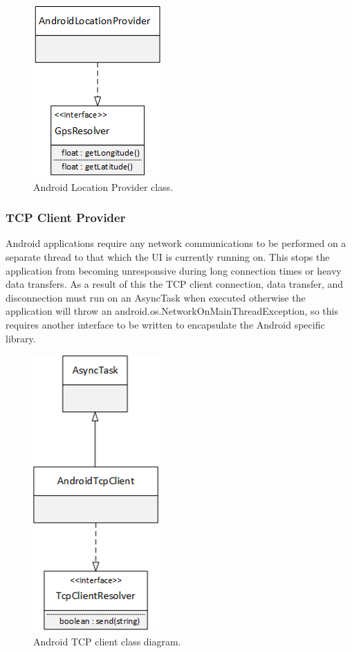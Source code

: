\begin{figure}[h!]
\centering\includegraphics{design/figures/ag-lp-cd.png}
\caption{Android Location Provider class.}
\label{alp-class}
\end{figure}

\subsubsection{TCP Client Provider}
\label{design:ag-tcp-1}
Android applications require any network communications to be performed on a separate thread to that which the UI is currently running on. This stops the application from becoming unresponsive during long connection times or heavy data transfers. As a result of this the TCP client connection, data transfer, and disconnection must run on an AsyncTask when executed otherwise the application will throw an android.os.NetworkOnMainThreadException, so this requires another interface to be written to encapsulate the Android specific library. 

\begin{figure}[h!]
\centering\includegraphics{design/figures/tcp-cd.png}
\caption{Android TCP client class diagram.}
\end{figure}

